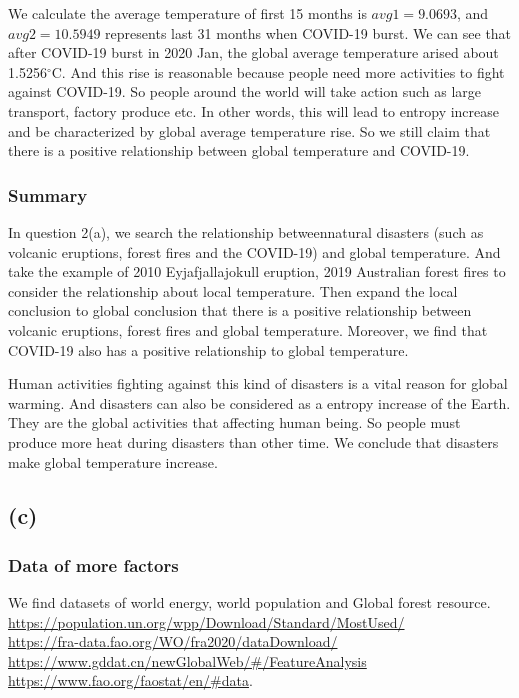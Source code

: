 \documentclass{apmcmthesis}
\def\oc{$^{\circ}$C\;}
\begin{document}
We calculate the average temperature of first 15 months is $avg1=9.0693$,
and $avg2=10.5949$ represents last 31 months when COVID-19 burst. 
We can see that after COVID-19 burst in 2020 Jan, the global average temperature arised about 1.5256\oc.
And this rise is reasonable because people need more activities to fight against COVID-19.
So people around the world will take action such as large transport, factory produce etc. 
In other words, this will lead to entropy increase and be characterized by global average temperature rise.
So we still claim that there is a positive relationship between global temperature and COVID-19.

\subsubsection{Summary}
In question 2(a), we search the relationship betweennatural disasters (such as volcanic eruptions, forest fires and the COVID-19) and global temperature.
And take the example of 2010 Eyjafjallajokull eruption, 2019 Australian forest fires to consider the relationship about local temperature.
Then expand the local conclusion to global conclusion that there is a positive relationship between volcanic eruptions, forest fires and global temperature. 
Moreover, we find that COVID-19 also has a positive relationship to global temperature.

Human activities fighting against this kind of disasters is a vital reason for global warming.
And disasters can also be considered as a entropy increase of the Earth.
They are the global activities that affecting human being.
So people must produce more heat during disasters than other time.
We conclude that disasters make global temperature increase.

\subsection{(c)}
\subsubsection{Data of more factors}
We find datasets of world energy, world population and Global forest resource. \\
\url{https://population.un.org/wpp/Download/Standard/MostUsed/}\\
\url{https://fra-data.fao.org/WO/fra2020/dataDownload/}\\
\url{https://www.gddat.cn/newGlobalWeb/#/FeatureAnalysis}\\
\url{https://www.fao.org/faostat/en/#data}.
\end{document}
